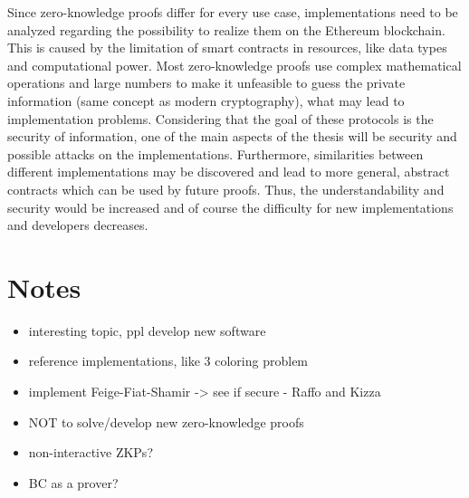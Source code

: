 \documentclass[a4paper,parskip=half]{scrartcl}
\begin{document}
Since zero-knowledge proofs differ for every use case, implementations need to be analyzed regarding the possibility to realize them on the Ethereum blockchain.
This is caused by the limitation of smart contracts in resources, like data types and computational power.
Most zero-knowledge proofs use complex mathematical operations and large numbers to make it unfeasible to guess the private information (same concept as modern cryptography), what may lead to implementation problems.
Considering that the goal of these protocols is the security of information, one of the main aspects of the thesis will be security and possible attacks on the implementations.
Furthermore, similarities between different implementations may be discovered and lead to more general, abstract contracts which can be used by future proofs.
Thus, the understandability and security would be increased and of course the difficulty for new implementations and developers decreases.

\section*{Notes}
\begin{itemize}
\item interesting topic, ppl develop new software
\item reference implementations, like 3 coloring problem
\item implement Feige-Fiat-Shamir \cite{feige1988zero} -> see if secure - Raffo and Kizza \cite{raffo2002digital, kizza2010feige}
\item NOT to solve/develop new zero-knowledge proofs
\item non-interactive ZKPs?
\item BC as a prover?
\end{itemize}



\end{document}
